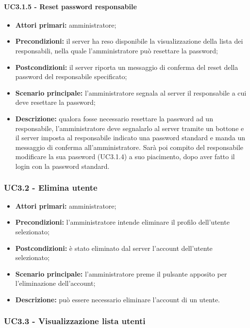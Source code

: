 \paragraph{UC3.1.5 - Reset password responsabile}

\begin{itemize}
	\item 	\textbf{Attori primari:} amministratore;
	\item 	\textbf{Precondizioni:} il server ha reso disponibile la visualizzazione della lista dei responsabili, nella quale l'amministratore può resettare la password;
	\item 	\textbf{Postcondizioni:} il server riporta un messaggio di conferma del reset della password del responsabile specificato;
	\item 	\textbf{Scenario principale:} l'amministratore segnala al server il responsabile a cui deve resettare la password;
	\item 	\textbf{Descrizione:} qualora fosse necessario resettare la password ad un responsabile, l'amministratore deve segnalarlo al server tramite un bottone e il server imposta al responsabile indicato una password standard e manda un messaggio di conferma all'amministratore. Sarà poi compito del responsabile modificare la sua password (UC3.1.4) a suo piacimento, dopo aver fatto il login con la password standard.

\end{itemize}

\subsubsection{UC3.2 - Elimina utente}

\begin{itemize}
	\item 	\textbf{Attori primari:} amministratore;
	\item 	\textbf{Precondizioni:} l'amministratore intende eliminare il profilo dell'utente selezionato;
	\item 	\textbf{Postcondizioni:} è stato eliminato dal server l'account dell'utente selezionato;
	\item 	\textbf{Scenario principale:} l'amministratore preme il pulsante apposito per l'eliminazione dell'account;
	\item 	\textbf{Descrizione:} può essere necessario eliminare l'account di un utente.
\end{itemize}

\subsubsection{UC3.3 - Visualizzazione lista utenti}

